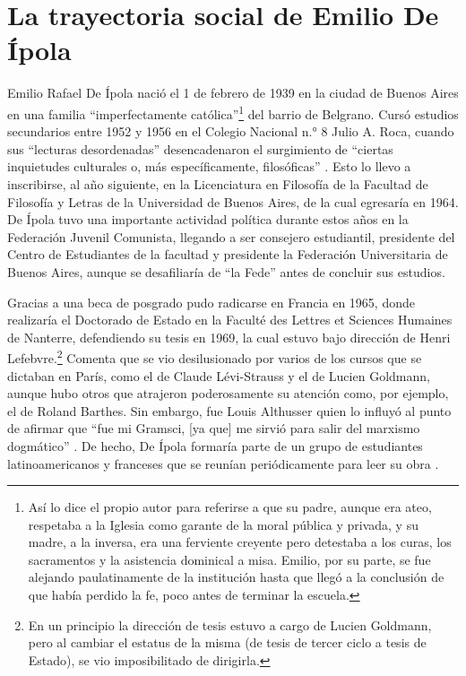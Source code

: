 {\section{La trayectoria social de Emilio De Ípola}

Emilio Rafael De Ípola nació el 1 de febrero de 1939 en la ciudad de Buenos Aires en una familia \enquote{imperfectamente católica}\footnote{Así lo dice el propio autor para referirse a que su padre, aunque era ateo, respetaba a la Iglesia como garante de la moral pública y privada, y su madre, a la inversa, era una ferviente creyente pero detestaba a los curas, los sacramentos y la asistencia dominical a misa. Emilio, por su parte, se fue alejando paulatinamente de la institución hasta que llegó a la conclusión de que había perdido la fe, poco antes de terminar la escuela.} del barrio de Belgrano. Cursó estudios secundarios entre 1952 y 1956 en el Colegio Nacional n.° 8 Julio A. Roca, cuando sus \enquote{lecturas desordenadas} desencadenaron el surgimiento de \enquote{ciertas inquietudes culturales o, más específicamente, filosóficas} \parencite{1604-DEIPOLA2009}. Esto lo llevo a inscribirse, al año siguiente, en la Licenciatura en Filosofía de la Facultad de Filosofía y Letras de la Universidad de Buenos Aires, de la cual egresaría en 1964. De Ípola tuvo una importante actividad política durante estos años en la Federación Juvenil Comunista, llegando a ser consejero estudiantil, presidente del Centro de Estudiantes de la facultad y presidente la Federación Universitaria de Buenos Aires, aunque se desafiliaría de \enquote{la Fede} antes de concluir sus estudios.

Gracias a una beca de posgrado pudo radicarse en Francia en 1965, donde realizaría el Doctorado de Estado en la Faculté des Lettres et Sciences Humaines de Nanterre, defendiendo su tesis en 1969, la cual estuvo bajo dirección de Henri Lefebvre.\footnote{En un principio la dirección de tesis estuvo a cargo de Lucien Goldmann, pero al cambiar el estatus de la misma (de tesis de tercer ciclo a tesis de Estado), se vio imposibilitado de dirigirla.} Comenta que se vio desilusionado por varios de los cursos que se dictaban en París, como el de Claude Lévi-Strauss y el de Lucien Goldmann, aunque hubo otros que atrajeron poderosamente su atención como, por ejemplo, el de Roland Barthes. Sin embargo, fue Louis Althusser quien lo influyó al punto de afirmar que \enquote{fue mi Gramsci, [ya que] me sirvió  para salir del marxismo dogmático} \parencite[22]{1605-DEIPOLA1991}. De hecho, De Ípola formaría parte de un grupo de estudiantes latinoamericanos y franceses que se reunían periódicamente para leer su obra \parencite{1601-DEIPOLA1994,1595-DEIPOLA2007}.

}
